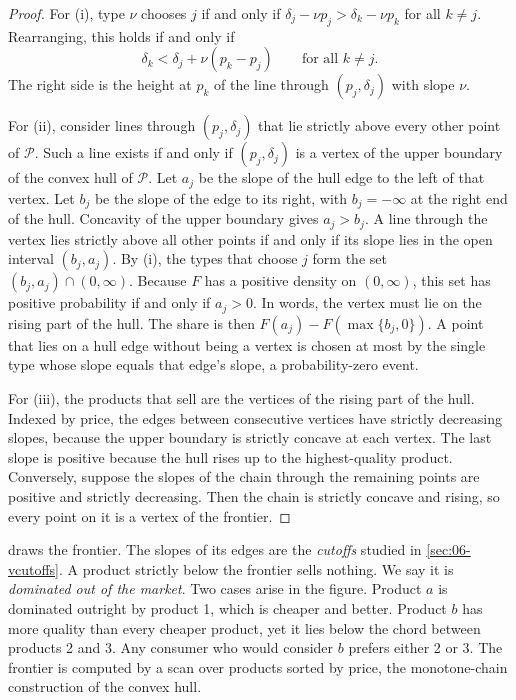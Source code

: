 \begin{proof}
For (i), type $\nu$ chooses $j$ if and only if $\delta_j - \nu p_j > \delta_k - \nu p_k$ for all $k \ne j$.
Rearranging, this holds if and only if
\begin{equation*}
  \delta_k < \delta_j + \nu(p_k - p_j) \qquad \text{for all } k \ne j .
\end{equation*}
The right side is the height at $p_k$ of the line through $(p_j, \delta_j)$ with slope $\nu$.

For (ii), consider lines through $(p_j, \delta_j)$ that lie strictly above every other point of
$\mathcal P$. Such a line exists if and only if $(p_j, \delta_j)$ is a vertex of the upper boundary of the
convex hull of $\mathcal P$. Let $a_j$ be the slope of the hull edge to the left of that vertex. Let $b_j$ be
the slope of the edge to its right, with $b_j = -\infty$ at the right end of the hull. Concavity of the
upper boundary gives $a_j > b_j$. A line through the vertex lies strictly above all other points if and
only if its slope lies in the open interval $(b_j, a_j)$. By (i), the types that choose $j$ form the set
$(b_j, a_j) \cap (0, \infty)$. Because $F$ has a positive density on $(0,\infty)$, this set has positive
probability if and only if $a_j > 0$. In words, the vertex must lie on the rising part of the hull. The
share is then $F(a_j) - F(\max\{b_j, 0\})$. A point that lies on a hull edge without being a
vertex is chosen at most by the single type whose slope equals that edge's slope, a probability-zero
event.

For (iii), the products that sell are the vertices of the rising part of the hull. Indexed by price, the
edges between consecutive vertices have strictly decreasing slopes, because the upper boundary is
strictly concave at each vertex. The last slope is positive because the hull rises up to the
highest-quality product. Conversely, suppose the slopes of the chain through the remaining points are
positive and strictly decreasing. Then the chain is strictly concave and rising, so every point on it is a
vertex of the frontier.
\end{proof}

 draws the frontier. The slopes of its edges are the \emph{cutoffs} studied in
\cref{sec:06-vcutoffs}. A product strictly below the frontier sells nothing. We say it is
\emph{dominated out of the market}. Two cases arise in the figure. Product $a$ is dominated outright by
product 1, which is cheaper and better. Product $b$ has more quality than every cheaper product, yet it
lies below the chord between products 2 and 3. Any consumer who would consider $b$ prefers either 2 or 3.
The frontier is computed by a scan over products sorted by price, the monotone-chain construction of the
convex hull.

